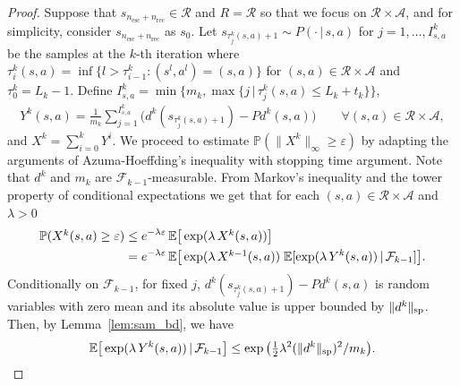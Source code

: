 \documentclass{article}
\theoremstyle{definition}
\theoremstyle{remark}
\newcommand{\expec}{\mathbb{E}}
\newcommand{\cA}{\mathcal{A}}
\newcommand{\cF}{\mathcal{F}}
\newcommand{\cP}{P}
\newcommand{\cR}{\mathcal{R}}
\renewcommand{\sp}[1]{\|{#1}\|_\text{\rm sp}}
\newcommand{\prob}{\mathbb{P}}
\begin{document}
\begin{proof}
Suppose that $s_{n_{\mathrm{esc}}+n_{\mathrm{rec}}} \in \cR$ and $R=\cR$ so that we focus on $\cR \times \cA$, and for simplicity, consider $s_{n_{\mathrm{esc}}+n_{\mathrm{rec}}}$ as $s_0$. Let $s_{\tau^k_{j}(s,a)+1}\sim \cP(\cdot \,|\, s,a)$ for $j=1,\ldots,I^k_{s,a}$ be the samples at the $k$-th iteration where $ \tau^k_i(s,a) = \inf \{l > \tau^k_{i-1} : (s^l, a^l)=(s,a)\} $  for $(s,a)\in\cR\times \cA$ and $\tau^k_0 = L_k-1$.  Define  $I^k_{s,a}=\min \{m_k, \max \{j \,|\, \tau^k_j(s,a) \le L_k+t_k\}\}$,
     \begin{align*}
         Y^{k}(s,a) =\mbox{$\frac{1}{m_k}\sum_{j=1}^{I^k_{s,a}}\big(d^k(s_{\tau^k_{j}(s,a)+1})$}-\cP d^k(s,a)\big)\qquad\forall (s,a)\in\cR\times\cA, 
     \end{align*} 
     and $X^k=\sum_{i=0}^kY^i$. We proceed to estimate $\prob(\|X^k\|_\infty\geq\varepsilon)$
by adapting the arguments of Azuma-Hoeffding's inequality with stopping time argument.
     Note that $d^k$ and $m_k$ are $\mathcal{F}_{k-1}$-measurable. 
From Markov's inequality and the tower property of conditional expectations we get that for each $(s,a)\in\cR\times \cA$ and $\lambda>0$
\begin{align}\nonumber
   \mbox{$ \prob( X^k(s,a) \ge \varepsilon)$} 
   & \le e^{-\lambda\varepsilon}\,\expec\big[\exp(\lambda\, \mbox{$X^k(s,a)$})\big]\\
   &= e^{-\lambda\varepsilon}\,\expec\big[\exp(\lambda\,\mbox{$X^{k-1}(s,a)$}) \;\expec[\exp(\lambda \, Y^{k}(s,a)) \,|\, \mathcal{F}_{k-1}]\big].\label{eq:a1}
\end{align}
Conditionally on $\cF_{k-1}$, for fixed $j$, $d^k(s_{\tau^k_{j}(s,a)+1})-\cP d^k(s,a)$ is random variables with zero mean and its absolute value is upper bounded by $ \sp{d^k}$. Then, by Lemma~\ref{lem:sam_bd}, we have 
\begin{align}
    \expec\big[\exp(\lambda\,Y^{k}(s,a)) \,|\, \mathcal{F}_{k-1}\big] 
    \le \exp\big(\mbox{$\frac{1}{2}$}\lambda^2(\sp{d^k})^2/m_k\big). \label{eq:a2}
\end{align}


\end{proof}
\end{document}
